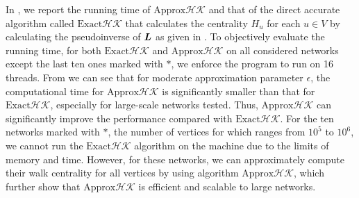 \documentclass[10pt,twocolumn,twoside]{IEEEtran}
\begin{document}
In , we report the running time of \(\text{Approx}\mathcal{HK}\) and that of the direct accurate algorithm called \(\text{Exact}\mathcal{HK}\) that calculates the centrality \(H_u\) for each \(u \in V\) by calculating the pseudoinverse of \(\boldsymbol{L}\) as given  in . To objectively evaluate the running time, for both \(\text{Exact}\mathcal{HK}\) and \(\text{Approx}\mathcal{HK}\) on all considered networks except the last ten ones marked with \(\ast\), we enforce the program to run on 16 threads. From  we can see that for  moderate approximation parameter \(\epsilon\), the computational time for \(\text{Approx}\mathcal{HK}\) is significantly  smaller than  that  for \(\text{Exact}\mathcal{HK}\), especially for large-scale networks tested.  Thus,   \(\text{Approx}\mathcal{HK}\) can significantly improve the performance compared with  \(\text{Exact}\mathcal{HK}\). For the  ten networks marked with \(\ast\), the number of vertices for which ranges from \(10^5\) to \(10^6\), we cannot run the \(\text{Exact}\mathcal{HK}\) algorithm on the machine due to the limits of memory and time. However, for these networks, we can approximately compute their walk centrality for all vertices by using algorithm \(\text{Approx}\mathcal{HK}\), which further show that   \(\text{Approx}\mathcal{HK}\) is  efficient and scalable to large networks.
\end{document}
